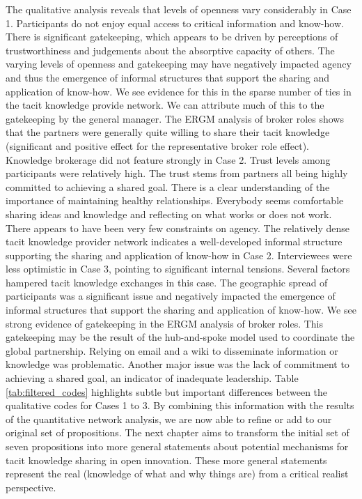The qualitative analysis reveals that levels of openness vary considerably in Case 1. Participants do not enjoy equal access to critical information and know-how. There is significant gatekeeping, which appears to be driven by perceptions of trustworthiness and judgements about the absorptive capacity of others. The varying levels of openness and gatekeeping may have negatively impacted agency and thus the emergence of informal structures that support the sharing and application of know-how. We see evidence for this in the sparse number of ties in the tacit knowledge provide network. We can attribute much of this to the gatekeeping by the general manager. The ERGM analysis of broker roles shows that the partners were generally quite willing to share their tacit knowledge (significant and positive effect for the representative broker role effect). Knowledge brokerage did not feature strongly in Case 2. Trust levels among participants were relatively high. The trust stems from partners all being highly committed to achieving a shared goal. There is a clear understanding of the importance of maintaining healthy relationships. Everybody seems comfortable sharing ideas and knowledge and reflecting on what works or does not work. There appears to have been very few constraints on agency. The relatively dense tacit knowledge provider network indicates a well-developed informal structure supporting the sharing and application of know-how in Case 2. Interviewees were less optimistic in Case 3, pointing to significant internal tensions. Several factors hampered tacit knowledge exchanges in this case. The geographic spread of participants was a significant issue and negatively impacted the emergence of informal structures that support the sharing and application of know-how. We see strong evidence of gatekeeping in the ERGM analysis of broker roles. This gatekeeping may be the result of the hub-and-spoke model used to coordinate the global partnership. Relying on email and a wiki to disseminate information or knowledge was problematic. Another major issue was the lack of commitment to achieving a shared goal, an indicator of inadequate leadership. \medskip  
Table \ref{tab:filtered_codes} highlights subtle but important differences between the qualitative codes for Cases 1 to 3. By combining this information with the results of the quantitative network analysis, we are now able to refine or add to our original set of propositions. The next chapter aims to transform the initial set of seven propositions into more general statements about potential mechanisms for tacit knowledge sharing in open innovation. These more general statements represent the real (knowledge of what and why things are) from a critical realist perspective.

